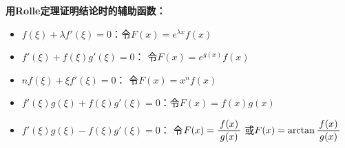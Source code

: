 \begin{thx}
	{\bf 用Rolle定理证明结论时的辅助函数：}
	\begin{itemize}
	  \item $f(\xi)+\lambda f'(\xi)=0$：令$F(x)=e^{\lambda x}f(x)$
	  \item $f'(\xi)+f(\xi)g'(\xi)=0$： 令$F(x)=e^{g(x)}f(x)$
	  \item $nf(\xi)+\xi f'(\xi)=0$： 令$F(x)=x^nf(x)$ 
	  \item $f'(\xi)g(\xi)+f(\xi)g'(\xi)=0$：令$F(x)=f(x)g(x)$
	  \item $f'(\xi)g(\xi)-f(\xi)g'(\xi)=0$： 令$F(x)=\displaystyle\frac{\,{f(x)}\,}{\,{g(x)}\,}$
	  或$F(x)=\arctan\displaystyle\frac{\,{f(x)}\,}{\,{g(x)}\,}$
	\end{itemize}
\end{thx}

